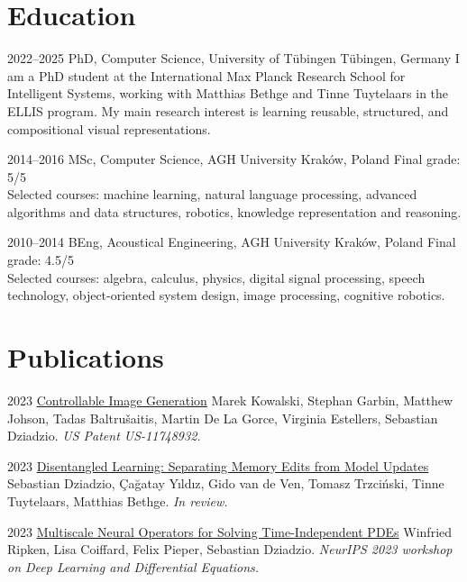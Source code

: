 \documentclass[]{friggeri-cv_osx}
\begin{document}
\section{Education}
\begin{entrylist}

\entry
{2022–2025}
{PhD, Computer Science, University of Tübingen}
{Tübingen, Germany}
{I am a PhD student at the International Max Planck Research School for Intelligent Systems, working with Matthias Bethge and Tinne Tuytelaars in the ELLIS program. My main research interest is learning reusable, structured, and compositional visual representations.\\}

\entry
{2014–2016}
{MSc, Computer Science, AGH University}
{Kraków, Poland}
{Final grade: 5/5\\
Selected courses: machine learning, natural language processing, advanced algorithms and data structures, robotics, knowledge representation and reasoning.\\}

\entry
{2010–2014}
{BEng, Acoustical Engineering, AGH University}
{Kraków, Poland}
{Final grade: 4.5/5\\
Selected courses: algebra, calculus, physics, digital signal processing, speech technology, object-oriented system design, image processing, cognitive robotics.}
\end{entrylist}


\newpage
\section{Publications}
\begin{entrylist}

\entry
{2023}
{\href{https://scholar.google.com/citations?user=8vAIQXoAAAAJ&hl=en}{Controllable Image Generation}}
{}
{Marek Kowalski, Stephan Garbin, Matthew Johson, Tadas Baltru\v{s}aitis, Martin De La Gorce, Virginia Estellers, Sebastian Dziadzio.
\textit{US Patent US-11748932.}\\}
\end{entrylist}

\entry
{2023}
{\href{https://scholar.google.com/citations?user=8vAIQXoAAAAJ&hl=en}{Disentangled Learning: Separating Memory Edits from Model Updates}}
{}
{Sebastian Dziadzio, Çağatay Yıldız, Gido van de Ven, Tomasz Trzciński, Tinne Tuytelaars, Matthias Bethge.
\textit{In review.}\\}

\entry
{2023}
{\href{https://scholar.google.com/citations?user=8vAIQXoAAAAJ&hl=en}{Multiscale Neural Operators for Solving Time-Independent PDEs}}
{}
{Winfried Ripken, Lisa Coiffard, Felix Pieper, Sebastian Dziadzio.
\textit{NeurIPS 2023 workshop on Deep Learning and Differential Equations.}\\}
\end{document}
